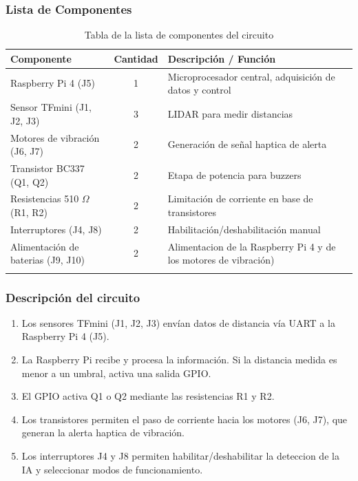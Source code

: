 \documentclass[12pt,a4paper]{article}
\begin{document}
\subsubsection{Lista de Componentes}
\begin{longtable}{|>{\raggedright}p{4cm}|c|>{\raggedright\arraybackslash}p{8cm}|}
\hline
\textbf{Componente} & \textbf{Cantidad} & \textbf{Descripción / Función} \\
\hline
Raspberry Pi 4 (J5) & 1 & Microprocesador central, adquisición de datos y control \\
\hline
Sensor TFmini (J1, J2, J3) & 3 & LIDAR para medir distancias \\
\hline
Motores de vibración (J6, J7) & 2 & Generación de señal haptica de alerta \\
\hline
Transistor BC337 (Q1, Q2) & 2 & Etapa de potencia para buzzers \\
\hline
Resistencias 510 $\Omega$ (R1, R2) & 2 & Limitación de corriente en base de transistores \\
\hline
Interruptores (J4, J8) & 2 & Habilitación/deshabilitación manual \\
\hline
Alimentación de baterias (J9, J10) & 2 & Alimentacion de la Raspberry Pi 4 y de los motores de vibración)\\
\hline
\caption{Tabla de la lista de componentes del circuito}
\end{longtable}

\subsubsection{Descripción del circuito}
\begin{enumerate}
    \item Los sensores TFmini (J1, J2, J3) envían datos de distancia vía UART a la Raspberry Pi 4 (J5).
    \item La Raspberry Pi recibe y procesa la información. Si la distancia medida es menor a un umbral, activa una salida GPIO.
    \item El GPIO activa Q1 o Q2 mediante las resistencias R1 y R2.
    \item Los transistores permiten el paso de corriente hacia los motores (J6, J7), que generan la alerta haptica de vibración.
    \item Los interruptores J4 y J8 permiten habilitar/deshabilitar la deteccion de la IA y seleccionar modos de funcionamiento.
\end{enumerate}
\end{document}
